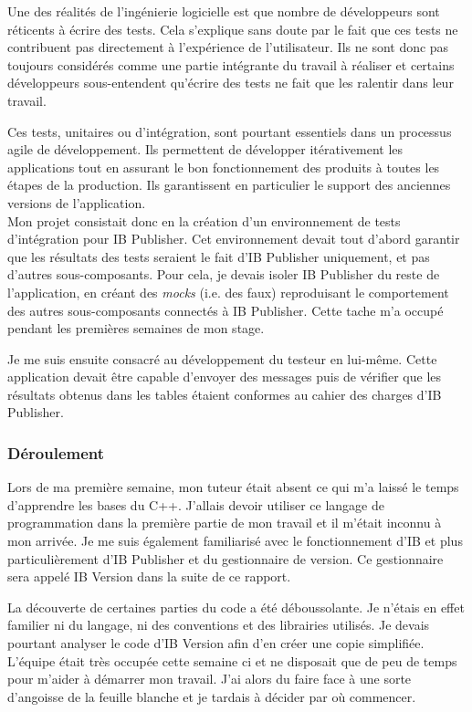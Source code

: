 \documentclass[11pt, oneside, titlepage, a4paper]{article}
\begin{document}
Une des réalités de l'ingénierie logicielle est que nombre de développeurs sont réticents à écrire des tests. Cela s'explique sans doute par le fait que ces tests ne contribuent pas directement à l'expérience de l'utilisateur. Ils ne sont donc pas toujours considérés comme une partie intégrante du travail à réaliser et certains développeurs sous-entendent qu'écrire des tests ne fait que les ralentir dans leur travail.

Ces tests, unitaires ou d'intégration, sont pourtant essentiels dans un processus agile de développement. Ils permettent de développer itérativement les applications tout en assurant le bon fonctionnement des produits à toutes les étapes de la production. Ils garantissent en particulier le support des anciennes versions de l'application.
\\

Mon projet consistait donc en la création d'un environnement de tests d'intégration pour IB Publisher. Cet environnement devait tout d'abord garantir que les résultats des tests seraient le fait d'IB Publisher uniquement, et pas d'autres sous-composants. Pour cela, je devais isoler IB Publisher du reste de l'application, en créant des \textit{mocks} (i.e. des faux) reproduisant le comportement des autres sous-composants connectés à IB Publisher. Cette tache m'a occupé pendant les premières semaines de mon stage.

Je me suis ensuite consacré au développement du testeur en lui-même. Cette application devait être capable d'envoyer des messages puis de vérifier que les résultats obtenus dans les tables étaient conformes au cahier des charges d'IB Publisher.
		\subsubsection{Déroulement}
Lors de ma première semaine, mon tuteur était absent ce qui m'a laissé le temps d'apprendre les bases du C++. J'allais devoir utiliser ce langage de programmation dans la première partie de mon travail et il m'était inconnu à mon arrivée. Je me suis également familiarisé avec le fonctionnement d'IB et plus particulièrement d'IB Publisher et du gestionnaire de version. Ce gestionnaire sera appelé IB Version dans la suite de ce rapport.

La découverte de certaines parties du code a été déboussolante. Je n'étais en effet familier ni du langage, ni des conventions et des librairies utilisés. Je devais pourtant analyser le code d'IB Version afin d'en créer une copie simplifiée. L'équipe était très occupée cette semaine ci et ne disposait que de peu de temps pour m'aider à démarrer mon travail. J'ai alors du faire face à une sorte d'angoisse de la feuille blanche et je tardais à décider par où commencer.
\\
\end{document}
